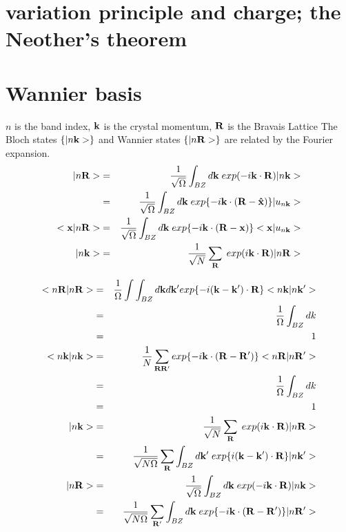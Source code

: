 \documentclass[aps,prb,preprint]{revtex4-1}
\begin{document}
\begin{appendix}
\section{variation principle and charge; the Neother's theorem}

\section{Wannier basis}
$n$ is the band index, $\bf k$ is the crystal momentum, ${\bf R} $ is the Bravais Lattice
The Bloch states $\{ |n{\bf k}> \}$ and Wannier states $\{ |n{\bf R}> \}$ are related by the Fourier expansion. 
\begin{eqnarray}
|n{\bf R}>&=&\frac{1}{\sqrt{\Omega}} \int_{BZ} d{\bf k} \; exp(-i{\bf k} \cdot {\bf R})|n{\bf k}>\\
&=&\frac{1}{\sqrt{\Omega}} \int_{BZ} d{\bf k} \; exp\{-i{\bf k} \cdot ({\bf R- \hat{x}})\}|u_{n{\bf k}}>\\
<{\bf x}|n{\bf R}>&=& \frac{1}{\sqrt{\Omega}} \int_{BZ} d{\bf k} \; exp\{-i{\bf k} \cdot ({\bf R- x})\}<{\bf x}|u_{n{\bf k}}>\\
|n{\bf k}>&=&\frac{1}{\sqrt{N}} \sum_{\bf R} \; exp(i{\bf k} \cdot {\bf R}) |n{\bf R}>
\end{eqnarray} 

\begin{eqnarray}
< n{\bf R}|n{\bf R}> &=& \frac{1}{\Omega}  \int \int_{BZ} d{\bf k} d{\bf k'} exp\{-i({\bf k-k'} )\cdot {\bf R}\}<n{\bf k}|n{\bf k'}>  \nonumber \\
&=& \frac{1}{\Omega} \int_{BZ} dk \nonumber \\
&=& 1 \\
< n{\bf k}|n{\bf k}> &=& \frac{1}{N}  \sum_{\bf RR'} exp\{-i{\bf k} \cdot ({\bf R-R'})\}<n{\bf R}|n{\bf R'}>  \nonumber \\
&=& \frac{1}{\Omega} \int_{BZ} dk \nonumber \\
&=& 1 \\
|n{\bf k}>&=&\frac{1}{\sqrt{N}} \sum_{\bf R} \; exp(i{\bf k} \cdot {\bf R}) |n{\bf R}> \nonumber \\
&=&\frac{1}{\sqrt{N \Omega}} \sum_{\bf R} \int_{BZ} d{\bf k'} \; exp\{i({\bf k-k'}) \cdot {\bf R} \}|n{\bf k'}>\nonumber \\
|n{\bf R}>&=&\frac{1}{\sqrt{\Omega}} \int_{BZ} d{\bf k} \; exp(-i{\bf k} \cdot {\bf R})|n{\bf k}> \nonumber \\
&=&\frac{1}{\sqrt{N \Omega}} \sum_{\bf R'} \int_{BZ} d{\bf k} \; exp\{-i{\bf k} \cdot ({\bf R-R'}) \}|n{\bf R'}>\nonumber \\
\end{eqnarray} 


\end{appendix}
\end{document}
